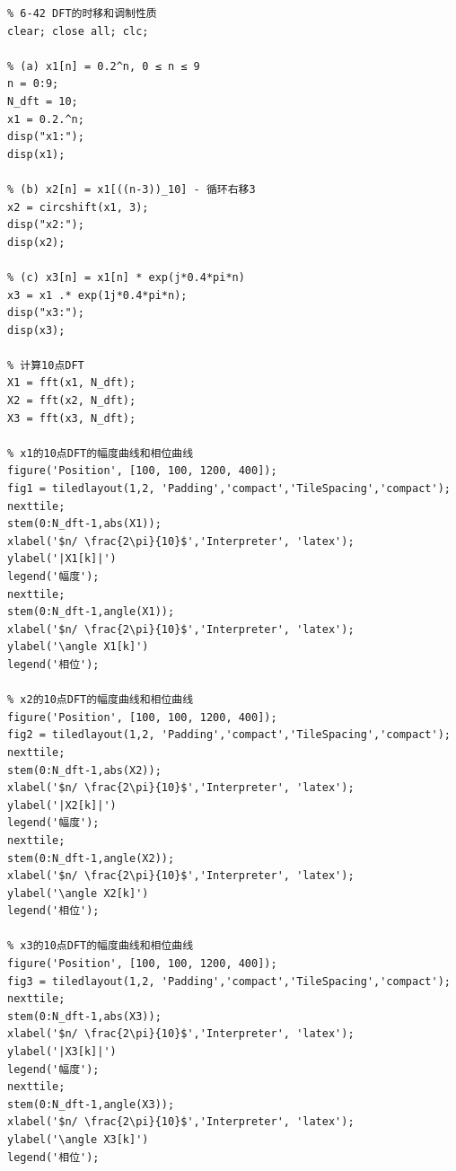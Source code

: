 \documentclass[UTF8,12pt,a4paper]{ctexart}
\begin{document}
\begin{lstlisting}
% 6-42 DFT的时移和调制性质
clear; close all; clc;

% (a) x1[n] = 0.2^n, 0 ≤ n ≤ 9
n = 0:9;
N_dft = 10;
x1 = 0.2.^n;
disp("x1:");
disp(x1);

% (b) x2[n] = x1[((n-3))_10] - 循环右移3
x2 = circshift(x1, 3);
disp("x2:");
disp(x2);

% (c) x3[n] = x1[n] * exp(j*0.4*pi*n)
x3 = x1 .* exp(1j*0.4*pi*n);
disp("x3:");
disp(x3);

% 计算10点DFT
X1 = fft(x1, N_dft);
X2 = fft(x2, N_dft);
X3 = fft(x3, N_dft);

% x1的10点DFT的幅度曲线和相位曲线
figure('Position', [100, 100, 1200, 400]);
fig1 = tiledlayout(1,2, 'Padding','compact','TileSpacing','compact');
nexttile; 
stem(0:N_dft-1,abs(X1));
xlabel('$n/ \frac{2\pi}{10}$','Interpreter', 'latex');
ylabel('|X1[k]|')
legend('幅度');
nexttile; 
stem(0:N_dft-1,angle(X1));
xlabel('$n/ \frac{2\pi}{10}$','Interpreter', 'latex');
ylabel('\angle X1[k]')
legend('相位');

% x2的10点DFT的幅度曲线和相位曲线
figure('Position', [100, 100, 1200, 400]);
fig2 = tiledlayout(1,2, 'Padding','compact','TileSpacing','compact');
nexttile; 
stem(0:N_dft-1,abs(X2));
xlabel('$n/ \frac{2\pi}{10}$','Interpreter', 'latex');
ylabel('|X2[k]|')
legend('幅度');
nexttile; 
stem(0:N_dft-1,angle(X2));
xlabel('$n/ \frac{2\pi}{10}$','Interpreter', 'latex');
ylabel('\angle X2[k]')
legend('相位');

% x3的10点DFT的幅度曲线和相位曲线
figure('Position', [100, 100, 1200, 400]);
fig3 = tiledlayout(1,2, 'Padding','compact','TileSpacing','compact');
nexttile; 
stem(0:N_dft-1,abs(X3));
xlabel('$n/ \frac{2\pi}{10}$','Interpreter', 'latex');
ylabel('|X3[k]|')
legend('幅度');
nexttile; 
stem(0:N_dft-1,angle(X3));
xlabel('$n/ \frac{2\pi}{10}$','Interpreter', 'latex');
ylabel('\angle X3[k]')
legend('相位');
\end{lstlisting}
\end{document}
